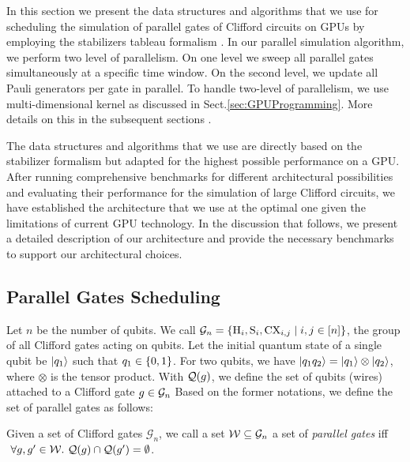 \documentclass[runningheads]{llncs}
\begin{document}
In this section we present the data structures and algorithms that we use for scheduling the simulation of parallel gates of Clifford circuits on GPUs by employing the stabilizers tableau formalism \cite{gottesman1997stabilizer}. In our parallel simulation algorithm, we perform two level of parallelism. On one level we sweep all parallel gates simultaneously at a specific time window. On the second level, we update all Pauli generators per gate in parallel. To handle two-level of parallelism, we use multi-dimensional kernel as discussed in Sect.\ref{sec:GPUProgramming}. More details on this in the subsequent sections . 

The data structures and algorithms that we use are directly based on the stabilizer formalism \cite{gottesman1997stabilizer} but adapted for the highest possible performance on a GPU. After running comprehensive benchmarks for different architectural possibilities and evaluating their performance for the simulation of large Clifford circuits, we have established the architecture that we use at the optimal one given the limitations of current GPU technology. In the discussion that follows, we present a detailed description of our architecture and provide the necessary benchmarks to support our architectural choices.

\subsection{Parallel Gates Scheduling}

Let $n$ be the number of qubits. We call $\mathcal{G}_n = \{\text{H}_i,\text{S}_i,\text{CX}_{i,j} \mid i,j \in [n] \}$, the group of all Clifford gates acting on \numQubits qubits. Let the initial quantum state of a single qubit be $\ket{q_1}$ such that $q_1 \in \{0,1\}$. For two qubits, we have $\ket{q_1q_2} = \ket{q_1}\otimes\ket{q_2}$, where $\otimes$ is the tensor product. With $\mathcal{Q}(g)$, we define the set of qubits (wires) attached to a Clifford gate $g \in \mathcal{G}_n$ Based on the former notations, we define the set of parallel gates \circuitWindow as follows:

\begin{definition}\label{def:window}
	Given a set of Clifford gates $\mathcal{G}_n$, we call a set $\mathcal{W}\subseteq\mathcal{G}_n$ a set of \emph{parallel gates} iff $\ \forall g,g'\in \mathcal{W}.\ \mathcal{Q}(g) \cap \mathcal{Q}(g') = \emptyset$.
\end{definition}
\end{document}
